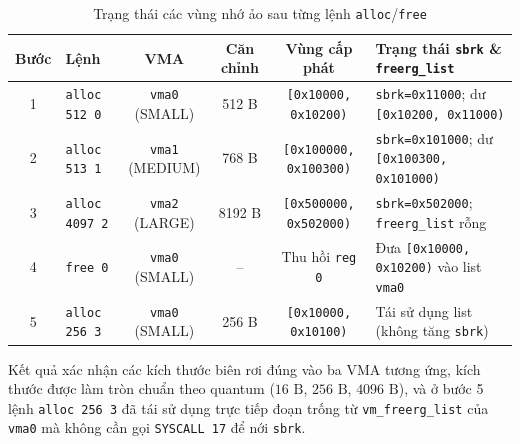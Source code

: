 \documentclass[12pt,a4paper]{article}
\begin{document}
    \begin{table}[htbp]
    \centering
    \footnotesize
    \setlength{\tabcolsep}{3pt}
    \caption{Trạng thái các vùng nhớ ảo sau từng lệnh \texttt{alloc}/\texttt{free}}
    \label{tab:alloc_trace}
    \begin{tabularx}{\textwidth}{@{}clccc>{\raggedright\arraybackslash}X@{}}
    \toprule
    \textbf{Bước} & \textbf{Lệnh} & \textbf{VMA} & \textbf{Căn chỉnh} & \textbf{Vùng cấp phát} & \textbf{Trạng thái \texttt{sbrk} \& \texttt{freerg\_list}} \\ \midrule
    1 & \texttt{alloc 512 0}  & \texttt{vma0} (SMALL)  & 512 B  & \texttt{[0x10000, 0x10200)}  & \texttt{sbrk=0x11000}; dư \texttt{[0x10200, 0x11000)} \\
    2 & \texttt{alloc 513 1}  & \texttt{vma1} (MEDIUM) & 768 B  & \texttt{[0x100000, 0x100300)} & \texttt{sbrk=0x101000}; dư \texttt{[0x100300, 0x101000)} \\
    3 & \texttt{alloc 4097 2} & \texttt{vma2} (LARGE)  & 8192 B & \texttt{[0x500000, 0x502000)} & \texttt{sbrk=0x502000}; \texttt{freerg\_list} rỗng \\
    4 & \texttt{free 0}       & \texttt{vma0} (SMALL)  & --     & Thu hồi \texttt{reg 0}        & Đưa \texttt{[0x10000, 0x10200)} vào list \texttt{vma0} \\
    5 & \texttt{alloc 256 3}  & \texttt{vma0} (SMALL)  & 256 B  & \texttt{[0x10000, 0x10100)}  & Tái sử dụng list (không tăng \texttt{sbrk}) \\ \bottomrule
    \end{tabularx}
    \end{table}
    
    Kết quả xác nhận các kích thước biên rơi đúng vào ba VMA tương ứng, kích thước được làm tròn chuẩn theo quantum ($16\text{ B}$, $256\text{ B}$, $4096\text{ B}$), và ở bước 5 lệnh \texttt{alloc 256 3} đã tái sử dụng trực tiếp đoạn trống từ \texttt{vm\_freerg\_list} của \texttt{vma0} mà không cần gọi \texttt{SYSCALL 17} để nới \texttt{sbrk}.
    
\end{document}
